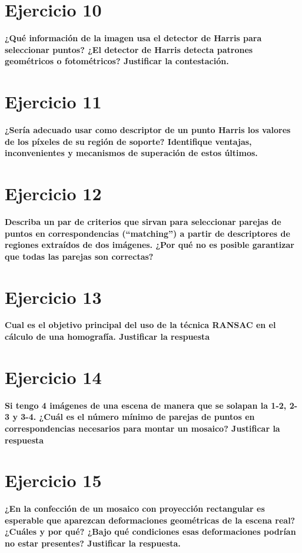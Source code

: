 \documentclass[11pt,a4paper]{article}
\begin{document}
\section*{Ejercicio 10}
\textbf{¿Qué información de la imagen usa el detector de Harris para seleccionar puntos? ¿El detector de Harris detecta patrones geométricos o fotométricos?
Justificar la contestación.}


\section*{Ejercicio 11}
\textbf{¿Sería adecuado usar como descriptor de un punto Harris los valores de los píxeles de su región de soporte? Identifique ventajas, inconvenientes y
mecanismos de superación de estos últimos.}


\section*{Ejercicio 12}
\textbf{Describa un par de criterios que sirvan para seleccionar parejas de puntos en correspondencias (“matching”) a partir de descriptores de regiones
extraídos de dos imágenes. ¿Por qué no es posible garantizar que todas las parejas son correctas?}


\section*{Ejercicio 13}
\textbf{Cual es el objetivo principal del uso de la técnica RANSAC en el cálculo de una homografía. Justificar la respuesta}


\section*{Ejercicio 14}
\textbf{Si tengo 4 imágenes de una escena de manera que se solapan la 1-2, 2-3 y 3-4. ¿Cuál es el número mínimo de parejas de puntos en correspondencias
necesarios para montar un mosaico? Justificar la respuesta}


\section*{Ejercicio 15}
\textbf{¿En la confección de un mosaico con proyección rectangular es esperable que aparezcan deformaciones geométricas de la escena real? ¿Cuáles y por qué?
¿Bajo qué condiciones esas deformaciones podrían no estar presentes? Justificar la respuesta.}
\end{document}
